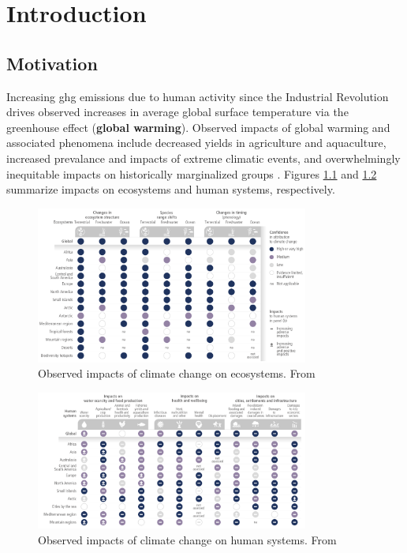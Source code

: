 \chapter{Introduction}%
\label{cha:introduction}

\section{Motivation}%
\label{sec:motivation}

Increasing \gls{ghg} emissions due to human activity since the Industrial
Revolution drives observed increases in average global surface temperature via
the greenhouse effect\cite{mitchell_greenhouse_1989}
\cite{paola_a_arias_2021_ts} (\textbf{global warming}).  Observed impacts of
global warming and associated phenomena include decreased yields in agriculture
and aquaculture, increased prevalance and impacts of extreme climatic events,
and overwhelmingly inequitable impacts on historically marginalized groups
\cite{hans_portner_2022_ts}. Figures \ref{fig:ipcc-ts3-a} and
\ref{fig:ipcc-ts3-b} summarize impacts on ecosystems and human systems,
respectively.

\begin{figure}[htpb]
    \centering
    \includegraphics[width=0.8\textwidth]{figs/ipcc-ts3-a.png}
    \caption{Observed impacts of climate change on ecosystems. From \cite{hans_portner_2022_ts}}
    \label{fig:ipcc-ts3-a}
\end{figure}

\begin{figure}[htpb]
    \centering
    \includegraphics[width=0.8\textwidth]{figs/ipcc-ts3-b.png}
    \caption{Observed impacts of climate change on human systems. From \cite{hans_portner_2022_ts}}
    \label{fig:ipcc-ts3-b}
\end{figure}

